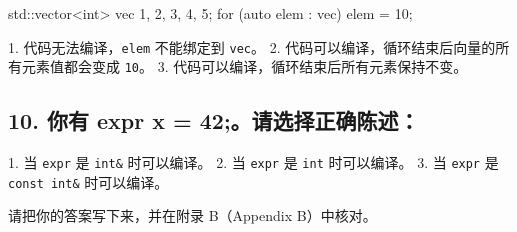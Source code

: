 \begin{codebox}[cpp]
std::vector<int> vec {1, 2, 3, 4, 5};
for (auto elem : vec)
    elem = 10;
\end{codebox}

1. 代码无法编译，\texttt{elem} 不能绑定到 \texttt{vec}。
2. 代码可以编译，循环结束后向量的所有元素值都会变成 \texttt{10}。
3. 代码可以编译，循环结束后所有元素保持不变。

\subsection{10. 你有 expr x = 42;。请选择正确陈述：}

1. 当 \texttt{expr} 是 \texttt{int\&} 时可以编译。
2. 当 \texttt{expr} 是 \texttt{int} 时可以编译。
3. 当 \texttt{expr} 是 \texttt{const int\&} 时可以编译。

请把你的答案写下来，并在附录 B（Appendix B）中核对。
